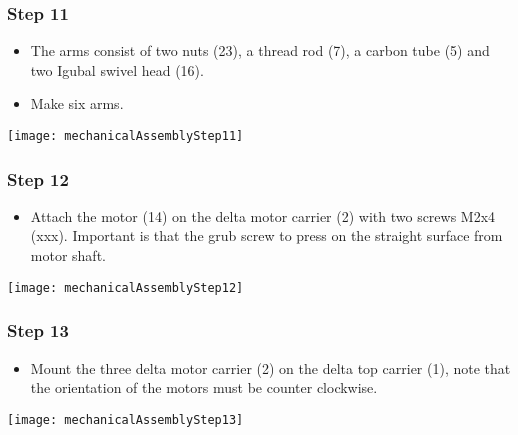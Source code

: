 \subsubsection{Step 11}

\begin{minipage}[t]{0.6\textwidth}
	\begin{itemize}
		\item The arms consist of two nuts (23), a thread rod (7), a carbon tube (5) and two Igubal swivel head (16).
		\item Make six arms.
	\end{itemize}
\end{minipage}
\hfill
\begin{minipage}[t]{0.35\textwidth}
	\vspace{-\ht\strutbox}\texttt{[image: mechanicalAssemblyStep11]}
	\label{fig:MechanicalAssebmlyStep11} 
\end{minipage}

\subsubsection{Step 12}

\begin{minipage}[t]{0.6\textwidth}
	\begin{itemize}
		\item Attach the motor (14) on the delta motor carrier (2) with two screws M2x4 (xxx). Important is that the grub screw to press on the straight surface from motor shaft.
	\end{itemize}
\end{minipage}
\hfill
\begin{minipage}[t]{0.35\textwidth}
	\vspace{-\ht\strutbox}\texttt{[image: mechanicalAssemblyStep12]}
	\label{fig:MechanicalAssebmlyStep12} 
\end{minipage}

\subsubsection{Step 13}

\begin{minipage}[t]{0.6\textwidth}
	\begin{itemize}
		\item Mount the three delta motor carrier (2) on the delta top carrier (1), note that the orientation of the motors must be counter clockwise.
	\end{itemize}
\end{minipage}
\hfill
\begin{minipage}[t]{0.35\textwidth}
	\vspace{-\ht\strutbox}\texttt{[image: mechanicalAssemblyStep13]}
	\label{fig:MechanicalAssebmlyStep13} 
\end{minipage}

